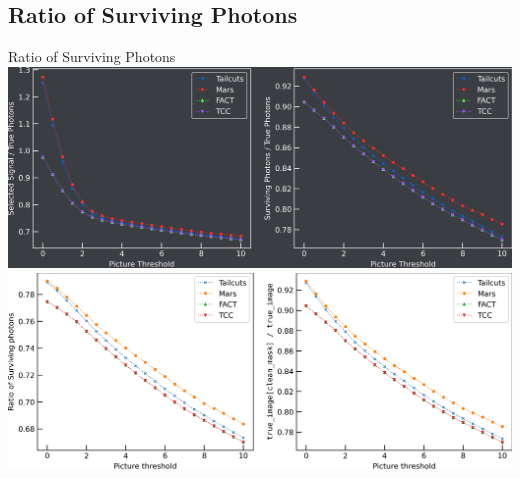 \subsection{Ratio of Surviving Photons}
\begin{frame}{Ratio of Surviving Photons}
  \ifdefined\darktheme
    \centering
    \includegraphics[width=\textwidth]{plots/surv_pixels_dark.png}
  \else
    \centering
    \includegraphics[width=\textwidth]{plots/surv_pixels_light.png}
  \fi
\end{frame}

